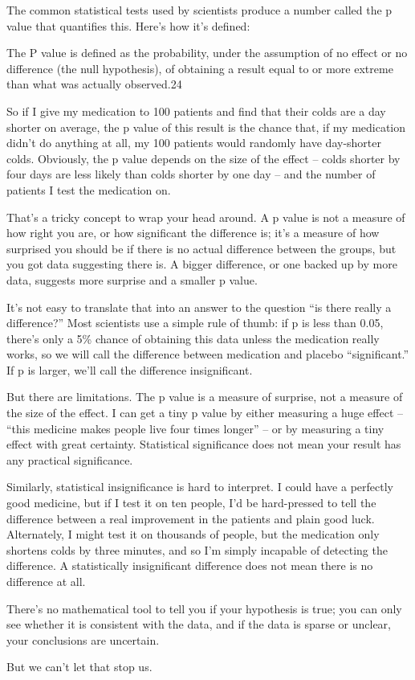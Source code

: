 The common statistical tests used by scientists produce a number called the p value that quantifies this. Here’s how it’s defined:

    The P value is defined as the probability, under the assumption of no effect or no difference (the null hypothesis), of obtaining a result equal to or more extreme than what was actually observed.24

So if I give my medication to 100 patients and find that their colds are a day shorter on average, the p value of this result is the chance that, if my medication didn’t do anything at all, my 100 patients would randomly have day-shorter colds. Obviously, the p value depends on the size of the effect – colds shorter by four days are less likely than colds shorter by one day – and the number of patients I test the medication on.

That’s a tricky concept to wrap your head around. A p value is not a measure of how right you are, or how significant the difference is; it’s a measure of how surprised you should be if there is no actual difference between the groups, but you got data suggesting there is. A bigger difference, or one backed up by more data, suggests more surprise and a smaller p value.

It’s not easy to translate that into an answer to the question “is there really a difference?” Most scientists use a simple rule of thumb: if p is less than 0.05, there’s only a 5\% chance of obtaining this data unless the medication really works, so we will call the difference between medication and placebo “significant.” If p is larger, we’ll call the difference insignificant.

But there are limitations. The p value is a measure of surprise, not a measure of the size of the effect. I can get a tiny p value by either measuring a huge effect – “this medicine makes people live four times longer” – or by measuring a tiny effect with great certainty. Statistical significance does not mean your result has any practical significance.

Similarly, statistical insignificance is hard to interpret. I could have a perfectly good medicine, but if I test it on ten people, I’d be hard-pressed to tell the difference between a real improvement in the patients and plain good luck. Alternately, I might test it on thousands of people, but the medication only shortens colds by three minutes, and so I’m simply incapable of detecting the difference. A statistically insignificant difference does not mean there is no difference at all.

There’s no mathematical tool to tell you if your hypothesis is true; you can only see whether it is consistent with the data, and if the data is sparse or unclear, your conclusions are uncertain.

But we can’t let that stop us.
